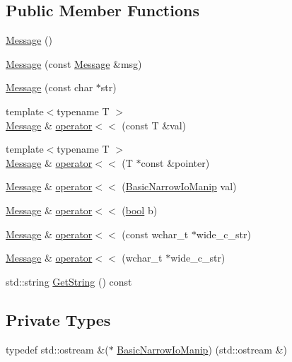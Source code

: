 \subsection*{Public Member Functions}
\begin{DoxyCompactItemize}
\item 
\hyperlink{classtesting_1_1Message_af5ba7216630df9845f18feb64b1a5383}{Message} ()
\item 
\hyperlink{classtesting_1_1Message_ac126e24804817a053bebba0920d94a11}{Message} (const \hyperlink{classtesting_1_1Message}{Message} \&msg)
\item 
\hyperlink{classtesting_1_1Message_a9de694ca239486809fc99fbbea8ac21d}{Message} (const char $\ast$str)
\item 
{\footnotesize template$<$typename T $>$ }\\\hyperlink{classtesting_1_1Message}{Message} \& \hyperlink{classtesting_1_1Message_a2e0e71be52d54c20a75a55fca812721f}{operator$<$$<$} (const T \&val)
\item 
{\footnotesize template$<$typename T $>$ }\\\hyperlink{classtesting_1_1Message}{Message} \& \hyperlink{classtesting_1_1Message_aa3ab685879958f90d2d8cd5b68d10c34}{operator$<$$<$} (T $\ast$const \&pointer)
\item 
\hyperlink{classtesting_1_1Message}{Message} \& \hyperlink{classtesting_1_1Message_a3a71a1c1c8ea52de5852d75483d41453}{operator$<$$<$} (\hyperlink{classtesting_1_1Message_ad398b70e2a11b923cef05c809b0eeb92}{Basic\+Narrow\+Io\+Manip} val)
\item 
\hyperlink{classtesting_1_1Message}{Message} \& \hyperlink{classtesting_1_1Message_a3e1e04f23b1bdfe18adfd59928296346}{operator$<$$<$} (\hyperlink{classbool}{bool} b)
\item 
\hyperlink{classtesting_1_1Message}{Message} \& \hyperlink{classtesting_1_1Message_ac0db9c22535b28bc863bfd0a1fdf7e14}{operator$<$$<$} (const wchar\+\_\+t $\ast$wide\+\_\+c\+\_\+str)
\item 
\hyperlink{classtesting_1_1Message}{Message} \& \hyperlink{classtesting_1_1Message_ac1d3a041ac4bb9c929ee746b31a13d6a}{operator$<$$<$} (wchar\+\_\+t $\ast$wide\+\_\+c\+\_\+str)
\item 
std\+::string \hyperlink{classtesting_1_1Message_a2cdc4df62bdcc9df37651a1cf527704e}{Get\+String} () const
\end{DoxyCompactItemize}
\subsection*{Private Types}
\begin{DoxyCompactItemize}
\item 
typedef std\+::ostream \&($\ast$ \hyperlink{classtesting_1_1Message_ad398b70e2a11b923cef05c809b0eeb92}{Basic\+Narrow\+Io\+Manip}) (std\+::ostream \&)
\end{DoxyCompactItemize}
